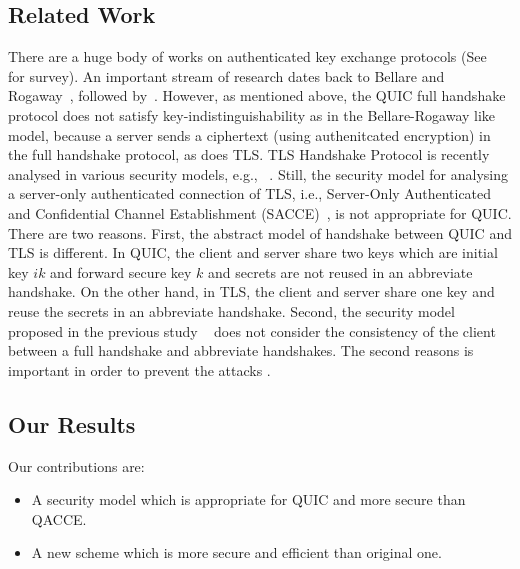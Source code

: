 \subsection{Related Work} \label{sec:Related Work}
There are a huge body of works on authenticated key
exchange protocols (See~\cite{CK01:AKE} for survey).
An important stream of research dates back to Bellare
and Rogaway~\cite{BR93:AKE}, followed by~\cite{DB96,
Blei98,JMDP00,JB02,EK09,KK05:TLS,KCRE08,SMOAJ08,KTT11,
Kraw01}.
However, as mentioned above, the QUIC full handshake
protocol does not satisfy key-indistinguishability as
in the Bellare-Rogaway like model, because a server
sends a ciphertext (using authenitcated encryption) in
the full handshake protocol, as does TLS.
TLS Handshake Protocol is recently analysed in various
security models, e.g., ~\cite{JKSS12:ACCE,KPW13:SACCE,
FS13:ACCE,GKS13:RACCE,BDKSS14:SSH,BFKPSB14:TLS}.
Still, the security model for analysing a server-only
authenticated connection of TLS, i.e., Server-Only
Authenticated and Confidential Channel Establishment
(SACCE)~\cite{KPW13:SACCE}, is not appropriate for QUIC.
There are two reasons. First, the abstract model of
handshake between QUIC and TLS is different. In QUIC,
the client and server share two keys which are initial
key $ik$ and forward secure key $k$ and secrets are not
reused in an abbreviate handshake. On the other hand,
in TLS, the client and server share one key and reuse
the secrets in an abbreviate handshake. Second, the
security model proposed in the previous study
~\cite{FG14:QUIC,LJBN15:QUIC} does not
consider the consistency of the client between a full
handshake and abbreviate handshakes.
The second reasons is important in order to prevent the
attacks \cite{LJBN15:QUIC}.

\subsection{Our Results} \label{sec:proposal}

Our contributions are:
\begin{itemize}
 \item{A security model which is appropriate for QUIC
 and more secure than QACCE.}

 \item{A new scheme which is more secure and efficient
 than original one.}
\end{itemize}

